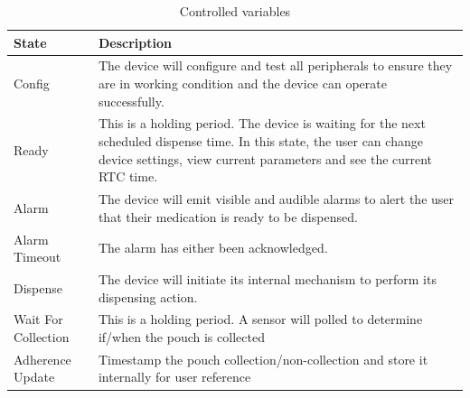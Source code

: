 \documentclass[12pt]{article}
\begin{document}
\begin{table}[H] \begin{center} \begin{adjustbox}{max width=\textwidth} \small
\begin{tabular}{|p{}|p{}|}
 \hline
 \textbf{State} & \textbf{Description}\\
 \hline 
 Config & The device will configure and test all peripherals to ensure they are in working condition and the device can operate successfully. \\
 
 \hline
 Ready & This is a holding period. The device is waiting for the next scheduled dispense time. In this state, the user can change device settings, view current parameters and see the current RTC time. \\
 
 \hline
 Alarm & The device will emit visible and audible alarms to alert the user that their medication is ready to be dispensed. \\
 \hline
  Alarm Timeout & The alarm has either been acknowledged. \\
 \hline
   Dispense & The device will initiate its internal mechanism to perform its dispensing action. \\
 \hline
   Wait For Collection & This is a holding period. A sensor will polled to determine if/when the pouch is collected  \\
 \hline
    Adherence Update & Timestamp the pouch collection/non-collection and store it internally for user reference \\
 \hline
 
 
\end{tabular}\end{adjustbox} \end{center}
\caption{Controlled variables}
\end{table}
\end{document}
